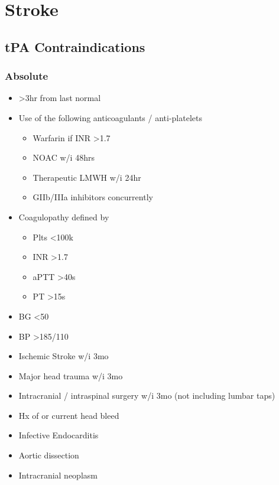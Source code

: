 \documentclass[8pt,twoside]{extarticle}
\begin{document}
\newpage

\section{Stroke}
\subsection*{tPA Contraindications}
\subsubsection*{Absolute}
\begin{multicols}{2}
\begin{itemize}[noitemsep]
	\item \textgreater 3hr from last normal
	\item Use of the following anticoagulants / anti-platelets
	\begin{itemize}[noitemsep]
		\item Warfarin if INR \textgreater 1.7
		\item NOAC w/i 48hrs
		\item Therapeutic LMWH w/i 24hr
		\item GIIb/IIIa inhibitors concurrently
	\end{itemize}
	\item Coagulopathy defined by
	\begin{itemize}[noitemsep]
		\item Plts \textless 100k
		\item INR \textgreater 1.7
		\item aPTT \textgreater 40s
		\item PT \textgreater 15s
	\end{itemize}
	\columnbreak
	\item BG \textless 50
	\item BP \textgreater 185/110
	\item Ischemic Stroke w/i 3mo
	\item Major head trauma w/i 3mo
	\item Intracranial / intraspinal surgery w/i 3mo (not including lumbar taps)
	\item Hx of or current head bleed
	\item Infective Endocarditis
	\item Aortic dissection
	\item Intracranial neoplasm
\end{itemize}
\end{multicols}
\end{document}
